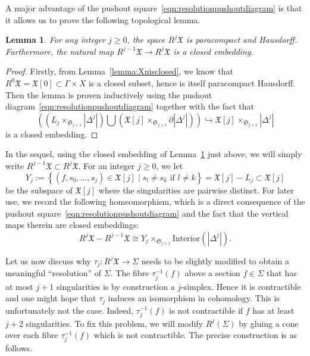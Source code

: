 \documentclass[a4paper]{amsart}
\newcommand{\fX}{\mathfrak X}
\newcommand{\fS}{\mathfrak S}
\theoremstyle{plain}
\newtheorem{lemma}[theorem]{Lemma}
\theoremstyle{definition}
\begin{document}
A major advantage of the pushout square~\eqref{eqn:resolutionpushoutdiagram} is that it allows us to prove the following topological lemma.
\begin{lemma}\label{lemma:paracompactHausdorff}
For any integer $j \geq 0$, the space $R^j\fX$ is paracompact and Hausdorff. Furthermore, the natural map $R^{j-1}\fX \to R^j\fX$ is a closed embedding.
\end{lemma}
\begin{proof}
Firstly, from Lemma~\ref{lemma:Xnisclosed}, we know that $R^0\fX = \fX[0] \subset \Gamma \times X$ is a closed subset, hence is itself paracompact Hausdorff. Then the lemma is proven inductively using the pushout diagram~\eqref{eqn:resolutionpushoutdiagram} together with the fact that 
\[
    \left( \left( L_j \times_{\fS_{j+1}} |\Delta^j|\right) \bigcup \left(\fX[j] \times_{\fS_{j+1}} \partial |\Delta^j|\right) \right) \hookrightarrow \fX[j] \times_{\fS_{j+1}} |\Delta^j|
\]
is a closed embedding. 
\end{proof}
In the sequel, using the closed embedding of Lemma~\ref{lemma:paracompactHausdorff} just above, we will simply write $R^{j-1}\fX \subset R^j\fX$. For an integer $j \geq 0$, we let 
\begin{equation}\label{eqn:Yjsubspacepairwisedistinct}
    Y_j := \left\{ (f,s_0, \ldots, s_j) \in \fX[j] \mid s_l \neq s_k \text{ if } l \neq k \right\} = \fX[j] - L_j \subset \fX[j]
\end{equation}
be the subspace of $\fX[j]$ where the singularities are pairwise distinct. For later use, we record the following homeomorphism, which is a direct consequence of the pushout square~\eqref{eqn:resolutionpushoutdiagram} and the fact that the vertical maps therein are closed embeddings:
\begin{equation}\label{eqn:filtrationleafhomeo}
    R^j\fX - R^{j-1}\fX \cong Y_j \times_{\fS_{j+1}} \mathrm{Interior}(|\Delta^j|).
\end{equation}


\bigskip


Let us now discuss why $\tau_j \colon R^j\fX \to \Sigma$ needs to be slightly modified to obtain a meaningful ``resolution'' of $\Sigma$. The fibre $\tau_j^{-1}(f)$ above a section $f \in \Sigma$ that has at most $j+1$ singularities is by construction a $j$-simplex. Hence it is contractible and one might hope that $\tau_j$ induces an isomorphism in cohomology. This is unfortunately not the case. Indeed, $\tau_j^{-1}(f)$ is not contractible if $f$ has at least $j+2$ singularities. To fix this problem, we will modify $R^j(\Sigma)$ by gluing a cone over each fibre $\tau_j^{-1}(f)$ which is not contractible. The precise construction is as follows.
\end{document}
